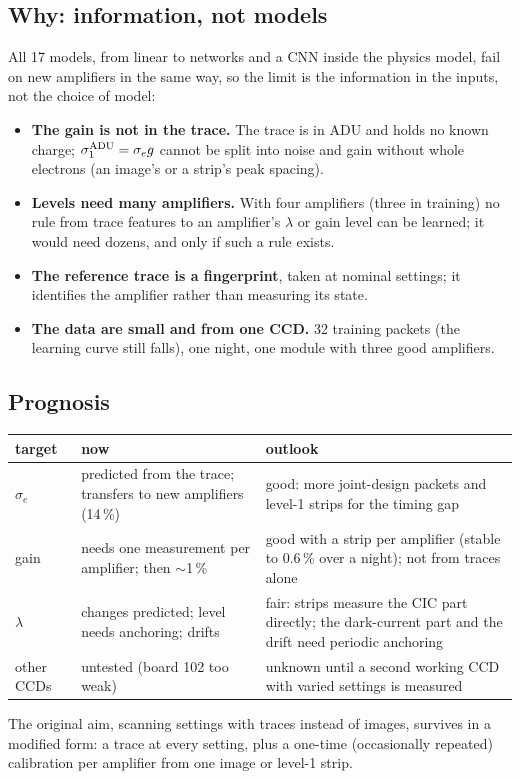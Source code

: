 \documentclass[11pt]{article}
\begin{document}
\subsection{Why: information, not models}
All 17 models, from linear to networks and a CNN inside the physics model, fail on new amplifiers in the same way, so
the limit is the information in the inputs, not the choice of model:
\begin{itemize}
\item \textbf{The gain is not in the trace.} The trace is in ADU and holds no known charge; $\sigma_1^{\rm ADU}=\sigma_e
  g$ cannot be split into noise and gain without whole electrons (an image's or a strip's peak spacing).
\item \textbf{Levels need many amplifiers.} With four amplifiers (three in training) no rule from trace features to
  an amplifier's $\lambda$ or gain level can be learned; it would need dozens, and only if such a rule exists.
\item \textbf{The reference trace is a fingerprint}, taken at nominal settings; it identifies the amplifier rather than
  measuring its state.
\item \textbf{The data are small and from one CCD.} 32 training packets (the learning curve still falls), one night,
  one module with three good amplifiers.
\end{itemize}

\subsection{Prognosis}
\begin{center}\small
\begin{tabular}{p{2cm}p{6.2cm}p{6.6cm}}\toprule
target & now & outlook\\\midrule
$\sigma_e$ & predicted from the trace; transfers to new amplifiers (14\,\%) & good: more joint-design packets and level-1 strips for the timing gap\\
gain & needs one measurement per amplifier; then $\sim$1\,\% & good with a strip per amplifier (stable to 0.6\,\% over a night); not from traces alone\\
$\lambda$ & changes predicted; level needs anchoring; drifts & fair: strips measure the CIC part directly; the dark-current part and the drift need periodic anchoring\\
other CCDs & untested (board 102 too weak) & unknown until a second working CCD with varied settings is measured\\\bottomrule
\end{tabular}
\end{center}
The original aim, scanning settings with traces instead of images, survives in a modified form: a trace at every setting,
plus a one-time (occasionally repeated) calibration per amplifier from one image or level-1 strip.
\end{document}
